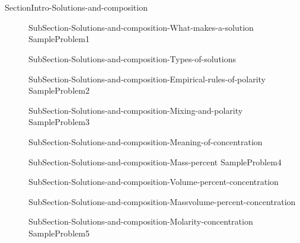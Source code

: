 \documentclass[main.tex]{subfiles} %
\newcommand\chapterlabel{Ch-electrolytes}\setcounter{figurenewcounter}{0}\setcounter{tablenewcounter}{0}\setcounter{formulanewcounter}{0}\chapterpicture{../{\chapterlabel}/figure1}\chapterpicturelabel{PxFuel}
\begin{document}
\section{\color{blue!30!black}{Solutions and composition}}
{SectionIntro-Solutions-and-composition}
\sloppy\begin{description}
\item[]{SubSection-Solutions-and-composition-What-makes-a-solution}
{SampleProblem1}
\item[] {SubSection-Solutions-and-composition-Types-of-solutions}
 \hspace{-0cm}{Figure-Dissolution}
\item[] {SubSection-Solutions-and-composition-Empirical-rules-of-polarity}
{SampleProblem2}
\item[]{SubSection-Solutions-and-composition-Mixing-and-polarity}
 \hspace{2cm}{Table-Polarity-and-mixing}	
{SampleProblem3}
\item[]{SubSection-Solutions-and-composition-Meaning-of-concentration}
\item[]{SubSection-Solutions-and-composition-Mass-percent}
{SampleProblem4}
\item[] {SubSection-Solutions-and-composition-Volume-percent-concentration}
\item[]{SubSection-Solutions-and-composition-Massvolume-percent-concentration}
\item[]{SubSection-Solutions-and-composition-Molarity-concentration}
{SampleProblem5}



\end{description}
\end{document}
